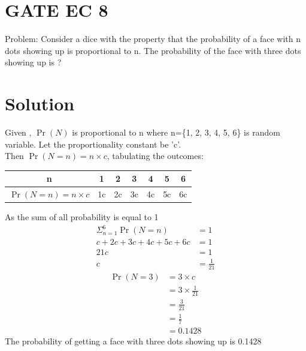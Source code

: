 \documentclass[journal,12pt,twocolumn]{IEEEtran}
\begin{document}
\section{GATE EC 8}

Problem: Consider a dice with the property that the probability of a face with n dots showing up is proportional to n. The probability of the face with three dots showing up is ?
\section{Solution}
Given , $\Pr(N)$ is proportional to n
 where n=\{1, 2, 3, 4, 5, 6\} is random variable. Let the proportionality constant be 'c'.\\
Then $\Pr(N = n) = n \times c $, tabulating the outcomes: 
\begin{center}
\begin{tabular}{ |c | c | c | c | c | c | c |}
\hline
n     & 1 & 2 & 3 & 4 & 5 & 6 \\
\hline
$\Pr(N = n ) = n \times c$ & 1c & 2c&3c &4c & 5c & 6c\\
\hline
\end{tabular}
\end{center}
As the sum of all probability is equal to 1
\begin{align}
\Sigma_{n =1}^6 \Pr(N=n) &= 1\\
c + 2c + 3c + 4c + 5c + 6c &= 1\\
21c &= 1\\
c &= \frac{1}{21}
\end{align}
\begin{align}
\Pr(N=3) &= 3 \times c\\
&= 3\times\frac{1}{21}\\
&= \frac{3}{21}\\
&= \frac{1}{7}\\
&= 0.1428   
\end{align}
The probability of getting a face with three dots showing up is 0.1428
\end{document}
